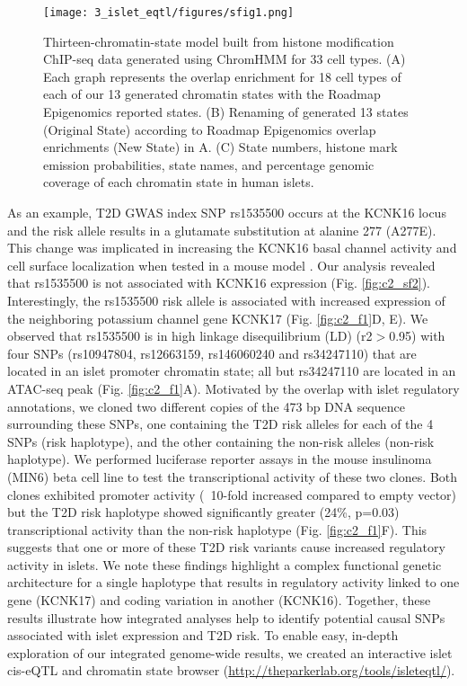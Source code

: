 \begin{figure}
    \centering
    \texttt{[image: 3\_islet\_eqtl/figures/sfig1.png]}
    \caption[Thirteen-chromatin-state model]{Thirteen-chromatin-state model built from histone modification ChIP-seq data generated using ChromHMM \cite{ernstMappingAnalysisChromatin2011} for 33 cell types. (A) Each graph represents the overlap enrichment for 18 cell types of each of our 13 generated chromatin states with the Roadmap Epigenomics \cite{theroadmapepigenomicsconsortiumIntegrativeAnalysis1112015} reported states. (B) Renaming of generated 13 states (Original State) according to Roadmap Epigenomics overlap enrichments (New State) in A. (C) State numbers, histone mark emission probabilities, state names, and percentage genomic coverage of each chromatin state in human islets.}
    \label{fig:c2_sf1}
\end{figure}

As an example, T2D GWAS index SNP rs1535500 occurs at the KCNK16 locus and the risk allele results in a glutamate substitution at alanine 277 (A277E). This change was implicated in increasing the KCNK16 basal channel activity and cell surface localization when tested in a mouse model \cite{vierraTypeDiabetesAssociated2015}. Our analysis revealed that rs1535500 is not associated with KCNK16 expression (Fig. \ref{fig:c2_sf2}). Interestingly, the rs1535500 risk allele is associated with increased expression of the neighboring potassium channel gene KCNK17 (Fig. \ref{fig:c2_f1}D, E).  We observed that rs1535500 is in high linkage disequilibrium (LD) (r2$>$0.95) with four SNPs (rs10947804, rs12663159, rs146060240 and rs34247110) that are located in an islet promoter chromatin state; all but rs34247110 are located in an ATAC-seq peak (Fig. \ref{fig:c2_f1}A).  Motivated by the overlap with islet regulatory annotations, we cloned two different copies of the 473 bp DNA sequence surrounding these SNPs, one containing the T2D risk alleles for each of the 4 SNPs (risk haplotype), and the other containing the non-risk alleles (non-risk haplotype). We performed luciferase reporter assays in the mouse insulinoma (MIN6) beta cell line to test the transcriptional activity of these two clones. Both clones exhibited promoter activity (~10-fold increased compared to empty vector) but the T2D risk haplotype showed significantly greater (24\%, p=0.03) transcriptional activity than the non-risk haplotype (Fig. \ref{fig:c2_f1}F). This suggests that one or more of these T2D risk variants cause increased regulatory activity in islets. We note these findings highlight a complex functional genetic architecture for a single haplotype that results in regulatory activity linked to one gene (KCNK17) and coding variation in another (KCNK16). Together, these results illustrate how integrated analyses help to identify potential causal SNPs associated with islet expression and T2D risk. To enable easy, in-depth exploration of our integrated genome-wide results, we created an interactive islet cis-eQTL and chromatin state browser (\url{http://theparkerlab.org/tools/isleteqtl/}).

